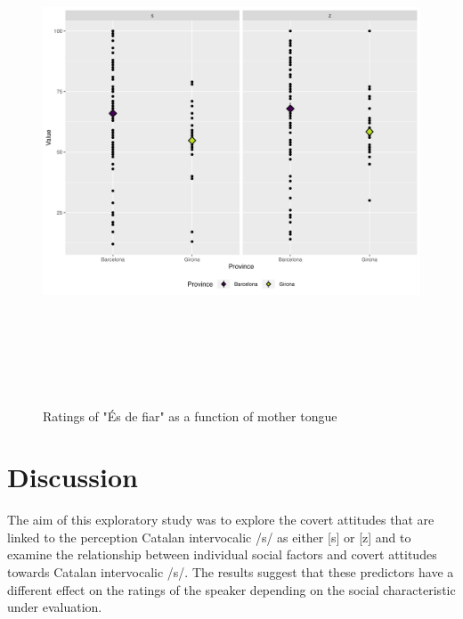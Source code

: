 \documentclass[
  a4paper,
  11pt,
  twocolumn]{article}
\begin{document}
\begin{figure}[!ht]
\begin{center}
\includegraphics[height=15cm]{./includes/figures/fiar.png}
\caption{Ratings of "És de fiar" as a function of mother tongue}\label{fig:fiar}
\end{center}
\end{figure}

\section{Discussion}

The aim of this exploratory study was to explore the covert attitudes
that are linked to the perception Catalan intervocalic /s/ as either
{[}s{]} or {[}z{]} and to examine the relationship between individual
social factors and covert attitudes towards Catalan intervocalic /s/.
The results suggest that these predictors have a different effect on the
ratings of the speaker depending on the social characteristic under
evaluation.
\end{document}
